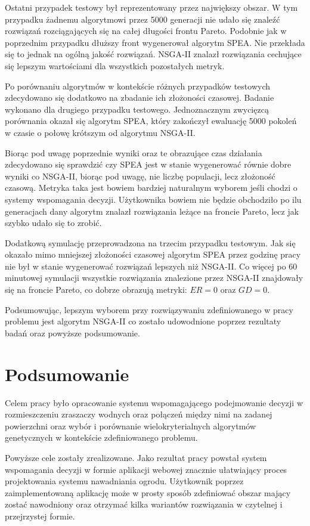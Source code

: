 \documentclass[twoside]{iisthesis}
\begin{document}
Ostatni przypadek testowy był reprezentowany przez największy obszar. W tym przypadku żadnemu algorytmowi przez 5000 generacji nie udało się znaleźć rozwiązań rozciągających się na całej długości frontu Pareto. Podobnie jak w poprzednim przypadku dłuższy front wygenerował algorytm SPEA. Nie przekłada się to jednak na ogólną jakość rozwiązań. NSGA-II znalazł rozwiązania cechujące się lepszym wartościami dla wszystkich pozostałych metryk.

Po porównaniu algorytmów w kontekście różnych przypadków testowych zdecydowano się dodatkowo na zbadanie ich złożoności czasowej. Badanie wykonano dla drugiego przypadku testowego. Jednoznacznym zwycięzcą porównania okazał się algorytm SPEA, który zakończył ewaluację 5000 pokoleń w czasie o połowę krótszym od algorytmu NSGA-II.

Biorąc pod uwagę poprzednie wyniki oraz te obrazujące czas działania zdecydowano się sprawdzić czy SPEA jest w stanie wygenerować równie dobre wyniki co NSGA-II, biorąc pod uwagę, nie liczbę populacji, lecz złożoność czasową. Metryka taka jest bowiem bardziej naturalnym wyborem jeśli chodzi o systemy wspomagania decyzji. Użytkownika bowiem nie będzie obchodziło po ilu generacjach dany algorytm znalazł rozwiązania leżące na froncie Pareto, lecz jak szybko udało się to zrobić.

Dodatkową symulację przeprowadzona na trzecim przypadku testowym. Jak się okazało mimo mniejszej złożoności czasowej algorytm SPEA przez godzinę pracy nie był w stanie wygenerować rozwiązań lepszych niż NSGA-II. Co więcej po 60 minutowej symulacji wszystkie rozwiązania znalezione przez NSGA-II znajdowały się na froncie Pareto, co dobrze obrazują metryki: $ER=0$ oraz $GD=0$.

Podsumowując, lepszym wyborem przy rozwiązywaniu zdefiniowanego w pracy problemu jest algorytm NSGA-II co zostało udowodnione poprzez rezultaty badań oraz powyższe podsumowanie.
\chapter{Podsumowanie}
Celem pracy było opracowanie systemu wspomagającego podejmowanie decyzji w rozmieszczeniu zraszaczy wodnych oraz połączeń między nimi na zadanej powierzchni oraz wybór i porównanie wielokryterialnych algorytmów genetycznych w kontekście zdefiniowanego problemu.

Powyższe cele zostały zrealizowane. Jako rezultat pracy powstał system wspomagania decyzji w formie aplikacji webowej znacznie ułatwiający proces projektowania systemu nawadniania ogrodu. Użytkownik poprzez zaimplementowaną aplikację może w prosty sposób zdefiniować obszar mający zostać nawodniony oraz otrzymać kilka wariantów rozwiązania w czytelnej i przejrzystej formie.
\end{document}
